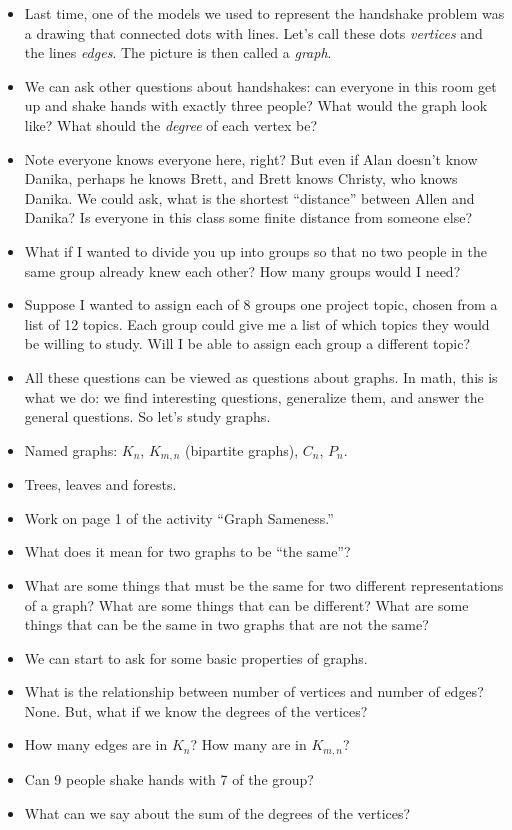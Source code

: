 \documentclass[12pt]{article}
\theoremstyle{plain}
\theoremstyle{definition}
\theoremstyle{remark}
\begin{document}
\begin{itemize}
\item Last time, one of the models we used to represent the handshake problem was a drawing that connected dots with lines.  Let's call these dots \emph{vertices} and the lines \emph{edges}. The picture is then called a \emph{graph}.
\item We can ask other questions about handshakes: can everyone in this room get up and shake hands with exactly three people?  What would the graph look like?  What should the \emph{degree} of each vertex be?
\item Note everyone knows everyone here, right?  But even if Alan doesn't know Danika, perhaps he knows Brett, and Brett knows Christy, who knows Danika.  We could ask, what is the shortest ``distance'' between Allen and Danika?  Is everyone in this class some finite distance from someone else?
\item What if I wanted to divide you up into groups so that no two people in the same group already knew each other?  How many groups would I need?
\item Suppose I wanted to assign each of 8 groups one project topic, chosen from a list of 12 topics.  Each group could give me a list of which topics they would be willing to study.  Will I be able to assign each group a different topic?

\item All these questions can be viewed as questions about graphs.  In math, this is what we do: we find interesting questions, generalize them, and answer the general questions.  So let's study graphs.


  \item Named graphs: $K_n$, $K_{m,n}$ (bipartite graphs), $C_n$, $P_n$.
  \item Trees, leaves and forests.
  \item Work on page 1 of the activity ``Graph Sameness.''
  \item What does it mean for two graphs to be ``the same''?
  \item What are some things that must be the same for two different representations of a graph?  What are some things that can be different?  What are some things that can be the same in two graphs that are not the same?

  \item We can start to ask for some basic properties of graphs.

  \item What is the relationship between number of vertices and number of edges?  None.  But, what if we know the degrees of the vertices?
  \item How many edges are in $K_n$?  How many are in $K_{m,n}$?
  \item Can 9 people shake hands with 7 of the group?
  \item What can we say about the sum of the degrees of the vertices?
\end{itemize}
\end{document}
